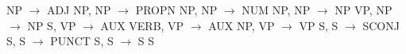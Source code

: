 NP $\to$ ADJ NP, NP $\to$ PROPN NP, NP $\to$ NUM NP, NP $\to$ NP VP, NP $\to$ NP S, VP $\to$ AUX VERB, VP $\to$ AUX NP, VP $\to$ VP S, S $\to$ SCONJ S, S $\to$ PUNCT S, S $\to$ S S